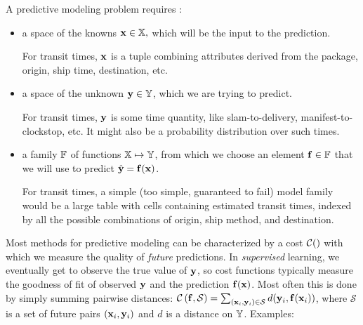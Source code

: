 \documentclass[10pt,openany]{article}
\numberwithin{definition}{section}
\numberwithin{example}{section}
\numberwithin{equation}{section}
\numberwithin{figure}{section}
\begin{document}
A predictive modeling problem requires 
\cite{friedman-2003,hastie-tibshirani-friedman-2009}:
\begin{itemize}
\item a space of the knowns ${\mathbf x}\in\mathbb{X},$ which will be the input to
the prediction. 


For transit times, ${\mathbf x}$ is a tuple combining attributes derived from
the package, origin, ship time, destination, etc. 

\item a space of the unknown ${\mathbf y}\in\mathbb{Y}$, which we are trying to predict. 


For transit times, ${\mathbf y}$ is some time quantity, like slam-to-delivery,
manifest-to-clockstop, etc. It might also be a probability distribution
over such times.

\item a family $\mathbb{F}$ of functions $\mathbb{X}\mapsto\mathbb{Y}$, from which
we choose an element ${\mathbf f}\in\mathbb{F}$ that we will use to predict $\hat{{\mathbf y}}={\mathbf f}({\mathbf x})$. 


For transit times, a simple (too simple, guaranteed to fail) model
family would be a large table with cells containing estimated transit
times, indexed by all the possible combinations of origin, ship method,
and destination. 

\end{itemize}
Most methods for predictive modeling can be characterized by a cost
$\mathcal{C}()$ with which we measure the quality of \emph{future }predictions.
In \emph{supervised} learning, we eventually get to observe the true
value of ${\mathbf y}$, so cost functions typically measure the goodness of
fit of observed ${\mathbf y}$ and the prediction ${\mathbf f}({\mathbf x})$. Most often this
is done by simply summing pairwise distances: 
$\mathcal{C}\left({\mathbf f},\mathcal{S}\right)=\sum_{({\mathbf x}_{i},{\mathbf y}_{i})\in\mathcal{S}}d({\mathbf y}_{i},{\mathbf f}({\mathbf x}_{i}))$,
where $\mathcal{S}$ is a set of future pairs $({\mathbf x}_{i},{\mathbf y}_{i})$ and $d$
is a  distance on $\mathbb{Y}$. Examples:
\end{document}
